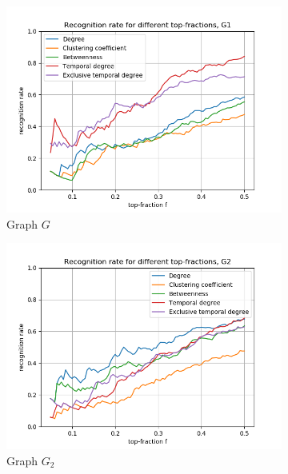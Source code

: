 \documentclass[letterpaper]{article}
\begin{document}
\begin{figure}
    \centering
    \begin{subfigure}[b]{0.32\textwidth}
        \includegraphics[width=\textwidth]{img/rankG.png}
        \caption{Graph \(G\)}
	    \label{fig:recognition_rates_G}
    \end{subfigure}
    \begin{subfigure}[b]{0.32\textwidth}
        \includegraphics[width=\textwidth]{img/rankG2.png}
        \caption{Graph \(G_2\)}
	    \label{fig:recognition_rates_G2}
    \end{subfigure}
    \begin{subfigure}[b]{0.32\textwidth}

\end{subfigure}
\end{figure}
\end{document}
